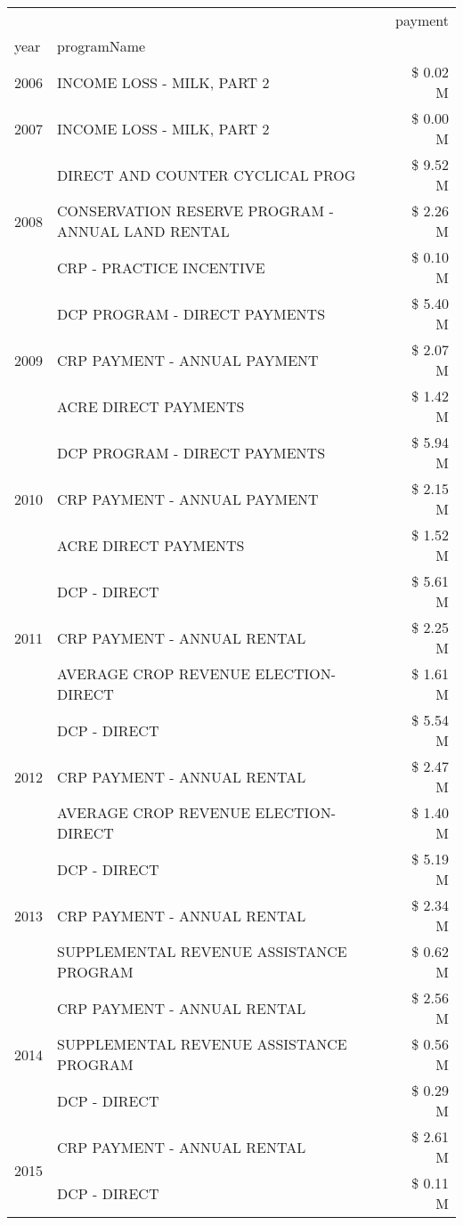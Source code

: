 \begin{tabular}{llr}
\toprule
 &  & payment \\
year & programName &  \\
\midrule
2006 & INCOME LOSS - MILK, PART 2 & \$ 0.02 M \\
\cline{1-3}
2007 & INCOME LOSS - MILK, PART 2 & \$ 0.00 M \\
\cline{1-3}
\multirow[t]{3}{*}{2008} & DIRECT AND COUNTER CYCLICAL PROG & \$ 9.52 M \\
 & CONSERVATION RESERVE PROGRAM - ANNUAL LAND RENTAL & \$ 2.26 M \\
 & CRP - PRACTICE INCENTIVE & \$ 0.10 M \\
\cline{1-3}
\multirow[t]{3}{*}{2009} & DCP PROGRAM - DIRECT PAYMENTS & \$ 5.40 M \\
 & CRP PAYMENT - ANNUAL PAYMENT & \$ 2.07 M \\
 & ACRE DIRECT PAYMENTS & \$ 1.42 M \\
\cline{1-3}
\multirow[t]{3}{*}{2010} & DCP PROGRAM - DIRECT PAYMENTS & \$ 5.94 M \\
 & CRP PAYMENT - ANNUAL PAYMENT & \$ 2.15 M \\
 & ACRE DIRECT PAYMENTS & \$ 1.52 M \\
\cline{1-3}
\multirow[t]{3}{*}{2011} & DCP - DIRECT & \$ 5.61 M \\
 & CRP PAYMENT - ANNUAL RENTAL & \$ 2.25 M \\
 & AVERAGE CROP REVENUE ELECTION-DIRECT & \$ 1.61 M \\
\cline{1-3}
\multirow[t]{3}{*}{2012} & DCP - DIRECT & \$ 5.54 M \\
 & CRP PAYMENT - ANNUAL RENTAL & \$ 2.47 M \\
 & AVERAGE CROP REVENUE ELECTION-DIRECT & \$ 1.40 M \\
\cline{1-3}
\multirow[t]{3}{*}{2013} & DCP - DIRECT & \$ 5.19 M \\
 & CRP PAYMENT - ANNUAL RENTAL & \$ 2.34 M \\
 & SUPPLEMENTAL REVENUE ASSISTANCE PROGRAM & \$ 0.62 M \\
\cline{1-3}
\multirow[t]{3}{*}{2014} & CRP PAYMENT - ANNUAL RENTAL & \$ 2.56 M \\
 & SUPPLEMENTAL REVENUE ASSISTANCE PROGRAM & \$ 0.56 M \\
 & DCP - DIRECT & \$ 0.29 M \\
\cline{1-3}
\multirow[t]{3}{*}{2015} & CRP PAYMENT - ANNUAL RENTAL & \$ 2.61 M \\
 & DCP - DIRECT & \$ 0.11 M \\

\end{tabular}
